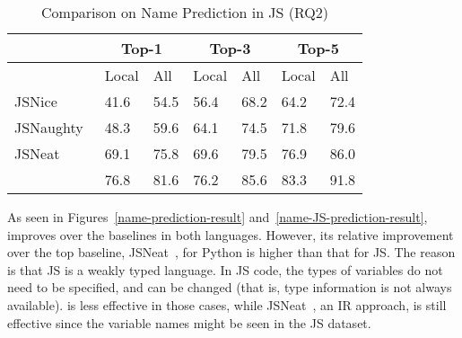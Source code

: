 \begin{table}[t]%
  \caption{Comparison on Name Prediction in JS (RQ2)}
  \vspace{-8pt}
	\begin{center}
		\small
		\renewcommand{\arraystretch}{1} \begin{tabular}{|p{1.9cm}<{\centering}|p{0.65cm}<{\centering}|p{0.65cm}<{\centering}|p{0.65cm}<{\centering}|p{0.65cm}<{\centering}|p{0.65cm}<{\centering}|p{0.65cm}<{\centering}|}
			
			\hline
                       & \multicolumn{2}{c|}{Top-1}         & \multicolumn{2}{c|}{Top-3}         & \multicolumn{2}{c|}{Top-5} \\
			\hline
                       & Local & All & Local & All & Local & All  \\ 
			\hline
		        JSNice~\cite{JSNice2015} &  41.6    & 54.5  & 56.4 &    68.2   & 64.2      &   72.4    \\
			JSNaughty~\cite{JSNaughty2017}  &   48.3   &  59.6    &  64.1    &  74.5    &  71.8    &   79.6    \\
			JSNeat~\cite{icse19}  &   69.1   &  75.8    &  69.6    & 79.5     &  76.9    & 86.0     \\
			\hline
			{\bf {\tool}} & 76.8 & 81.6 & 76.2 & 85.6 & 83.3 & 91.8 \\
			\hline
		\end{tabular}
		\label{name-JS-result}
	\end{center}
\end{table}

As seen in Figures~\ref{name-prediction-result}
and~\ref{name-JS-prediction-result}, {\tool} improves over the
baselines in both languages. However, its relative improvement over
the top baseline, JSNeat~\cite{icse19}, for Python is higher than that
for JS. The reason is that JS is a weakly typed language. In JS
code, the types of variables do not need to be specified, and can be
changed (that is, type information is not always available). {\tool}
is less effective in those cases, while JSNeat~\cite{icse19}, an IR
approach, is still effective since the variable names might be seen in
the JS dataset.



